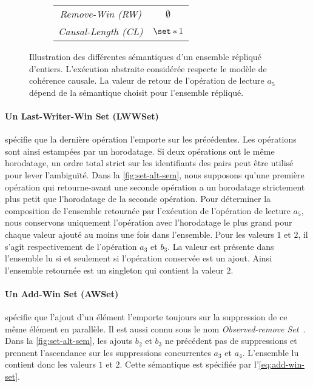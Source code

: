 \begin{figure}[htb]
\begin{subfigure}{\linewidth}
\begin{tabular}{c|c}
        \emph{Remove-Win (RW)} & $\emptyset$ \\
        \emph{Causal-Length (CL)} & $\set*{1}$ \\
    \end{tabular}
    \caption{}\label{fig:set-alt-sem-2}
\end{subfigure}
\caption[Sémantiques d'un ensemble répliqué]{Illustration des différentes sémantiques d'un ensemble répliqué d'entiers.
 L'exécution abstraite considérée respecte le modèle de cohérence causale.
 La valeur de retour de l'opération de lecture $a_5$ dépend de la sémantique choisit pour l'ensemble répliqué.
}\label{fig:set-alt-sem}
\end{figure}

\paragraph{Un Last-Writer-Win Set (LWWSet)} \autocite{shapiro2011_comprehensive} spécifie que la dernière opération l'emporte sur les précédentes. Les opérations sont ainsi estampées par un horodatage.
Si deux opérations ont le même horodatage, un ordre total strict sur les identifiants des pairs peut être utilisé pour lever l'ambiguïté.
Dans la \autoref{fig:set-alt-sem}, nous supposons qu'une première opération qui retourne-avant une seconde opération a un horodatage strictement plus petit que l'horodatage de la seconde opération.
Pour déterminer la composition de l'ensemble retournée par l'exécution de l'opération de lecture $a_5$, nous conservons uniquement l'opération avec l'horodatage le plus grand pour chaque valeur ajouté au moins une fois dans l'ensemble.
Pour les valeurs $1$ et $2$, il s'agit respectivement de l'opération $a_3$ et $b_3$.
La valeur est présente dans l'ensemble lu si et seulement si l'opération conservée est un ajout.
Ainsi l'ensemble retournée est un singleton qui contient la valeur $2$.

\paragraph{Un Add-Win Set (AWSet)} \autocite{shapiro_2011_crdt} spécifie que l'ajout d'un élément l'emporte toujours sur la suppression de ce même élément en parallèle.
Il est aussi connu sous le nom \emph{Observed-remove Set}~\autocite{shapiro_2011_crdt}.
Dans la \autoref{fig:set-alt-sem}, les ajouts $b_2$ et $b_3$ ne précédent pas de suppressions et prennent l'ascendance sur les suppressions concurrentes $a_3$ et $a_4$.
L'ensemble lu contient donc les valeurs $1$ et $2$.
Cette sémantique est spécifiée par l'\autoref{eq:add-win-set}.

